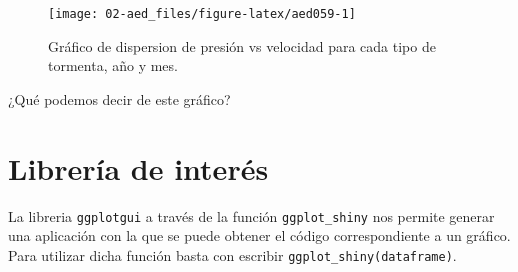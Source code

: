 \documentclass[
]{book}
\newenvironment{Shaded}{\begin{snugshade}}{\end{snugshade}}
\newcommand{\AttributeTok}[1]{\textcolor[rgb]{0.77,0.63,0.00}{#1}}
\newcommand{\CommentTok}[1]{\textcolor[rgb]{0.56,0.35,0.01}{\textit{#1}}}
\newcommand{\DecValTok}[1]{\textcolor[rgb]{0.00,0.00,0.81}{#1}}
\newcommand{\FunctionTok}[1]{\textcolor[rgb]{0.00,0.00,0.00}{#1}}
\newcommand{\NormalTok}[1]{#1}
\newcommand{\OtherTok}[1]{\textcolor[rgb]{0.56,0.35,0.01}{#1}}
\newcommand{\SpecialCharTok}[1]{\textcolor[rgb]{0.00,0.00,0.00}{#1}}
\newcommand{\StringTok}[1]{\textcolor[rgb]{0.31,0.60,0.02}{#1}}
\begin{document}
\begin{Shaded}
\end{Shaded}

\begin{figure}

{\centering \texttt{[image: 02-aed\_files/figure-latex/aed059-1]} 

}

\caption{Gráfico de dispersion de presión vs velocidad para cada tipo de tormenta, año y mes.}\label{fig:aed059}
\end{figure}

¿Qué podemos decir de este gráfico?

\hypertarget{libreruxeda-de-interuxe9s}{%
\section{Librería de interés}\label{libreruxeda-de-interuxe9s}}

La libreria \texttt{ggplotgui} a través de la función \texttt{ggplot\_shiny} nos permite generar una aplicación con la que se puede obtener el código correspondiente a un gráfico. Para utilizar dicha función basta con escribir \texttt{ggplot\_shiny(dataframe)}.
\end{document}
